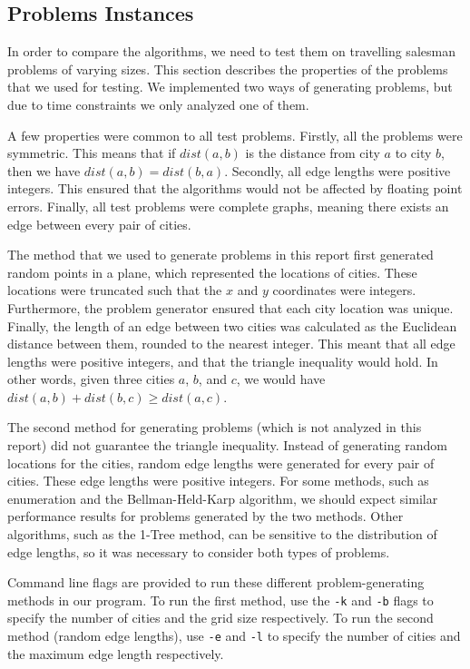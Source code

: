 \documentclass[11pt]{article}
\begin{document}
	\subsection{Problems Instances}
	\label{sec:data}
	In order to compare the algorithms, we need to test them on travelling salesman problems of varying sizes. This section describes the properties of the problems that we used for testing. We implemented two ways of generating problems, but due to time constraints we only analyzed one of them.
	
	A few properties were common to all test problems. Firstly, all the problems were symmetric. This means that if $dist(a,b)$ is the distance from city $a$ to city $b$, then we have $dist(a,b) = dist(b,a)$. Secondly, all edge lengths were positive integers. This ensured that the algorithms would not be affected by floating point errors. Finally, all test problems were complete graphs, meaning there exists an edge between every pair of cities.
	
	The method that we used to generate problems in this report first generated random points in a plane, which represented the locations of cities. These locations were truncated such that the $x$ and $y$ coordinates were integers. Furthermore, the problem generator ensured that each city location was unique. Finally, the length of an edge between two cities was calculated as the Euclidean distance between them, rounded to the nearest integer. This meant that all edge lengths were positive integers, and that the triangle inequality would hold. In other words, given three cities $a$, $b$, and $c$, we would have $dist(a,b) + dist(b,c) \geq dist(a,c)$.
	
	The second method for generating problems (which is not analyzed in this report) did not guarantee the triangle inequality. Instead of generating random locations for the cities, random edge lengths were generated for every pair of cities. These edge lengths were positive integers. For some methods, such as enumeration and the Bellman-Held-Karp algorithm, we should expect similar performance results for problems generated by the two methods. Other algorithms, such as the 1-Tree method, can be sensitive to the distribution of edge lengths, so it was necessary to consider both types of problems.
	
	Command line flags are provided to run these different problem-generating methods in our program. To run the first method, use the \texttt{-k} and \texttt{-b} flags to specify the number of cities and the grid size respectively. To run the second method (random edge lengths), use \texttt{-e} and \texttt{-l} to specify the number of cities and the maximum edge length respectively.
	
\end{document}
